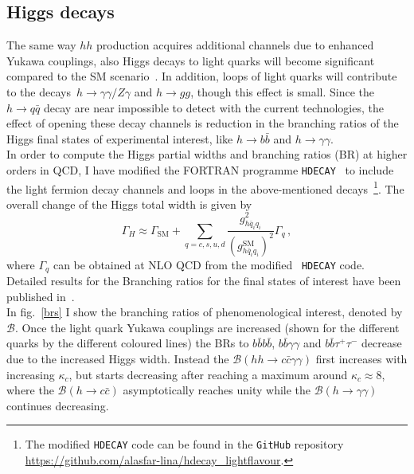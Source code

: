 \subsection{Higgs decays \label{sec:Hdecay}}
The same way $hh$ production acquires additional channels due to enhanced Yukawa couplings, also Higgs decays to light quarks will become significant compared to the SM scenario~\cite{deFlorian:2016spz}.  In addition, loops of light quarks will contribute to the decays~$h \to \gamma \gamma/Z \gamma$ and $ h \to gg$, though this effect is small.  Since the $ h \to q\bar q$ decay are near impossible to detect with the current technologies, the effect of opening these decay channels is reduction in the branching ratios of the Higgs final states of experimental interest, like $ h \to b \bar b $ and $ h \to \gamma \gamma$. \\ In order to compute the Higgs partial widths and branching ratios (BR) at higher orders in QCD, I have modified the FORTRAN programme \texttt{HDECAY}~\cite{Djouadi:1997yw,Djouadi:2018xqq} to include the light fermion decay channels and loops in the above-mentioned decays~\footnote{The modified \texttt{HDECAY} code can be found in the \texttt{GitHub} repository \url{https://github.com/alasfar-lina/hdecay_lightflavour}.}. The overall change of the Higgs total width is given by
\begin{equation}
	\Gamma_H \approx \Gamma_{\text{SM}}+\sum_{q=c,s,u,d}\frac{g_{h \bar{q}_i q_i}^2}{(g_{h \bar{q}_i q_i}^{\text{SM}})^2}\Gamma_{q}\,,
\end{equation}
where $\Gamma_q$ can be obtained at NLO QCD from the modified ~\texttt{HDECAY} code. Detailed results for the Branching ratios for the final states of interest have been published in~\cite{Alasfar:2019pmn}.\\ 
In fig.~\ref{brs} I show the branching ratios of phenomenological interest, denoted by $\mathcal{B}$. Once  the light quark Yukawa couplings are increased (shown for the different quarks by the different coloured lines) the BRs to $b\bar{b}b\bar{b}$, $b\bar{b}\gamma\gamma$ and $b\bar{b}\tau^+\tau^-$ decrease due to the increased Higgs width. Instead the $\mathcal{B}(hh\to c\bar{c}\gamma\gamma)$ first increases with increasing $\kappa_c$, but starts decreasing after reaching a maximum around $\kappa_c\approx 8$, where the $\mathcal{B}(h\to c\bar{c})$ asymptotically reaches unity while the $\mathcal{B}(h\to \gamma \gamma)$ continues decreasing.
